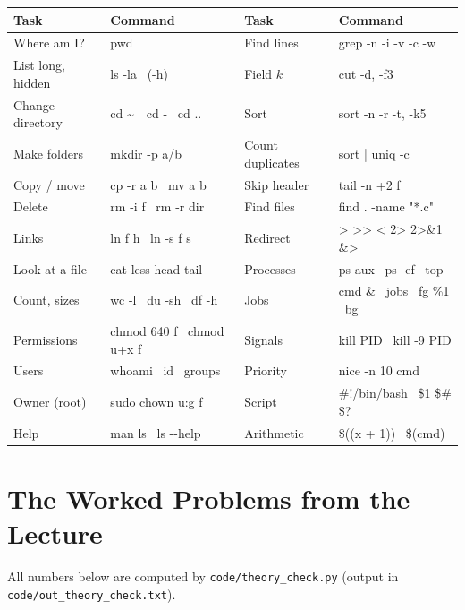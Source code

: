 \documentclass[11pt,a4paper]{article}
\begin{document}
\begin{center}
\vspace{0.6em}
\renewcommand{\arraystretch}{1.15}
\begin{tabularx}{\linewidth}{@{}>{\raggedright\arraybackslash}p{3.0cm}>{\ttfamily\raggedright\arraybackslash}X>{\raggedright\arraybackslash}p{3.0cm}>{\ttfamily\raggedright\arraybackslash}X@{}}
\toprule
\textbf{Task} & \textbf{\rmfamily Command} & \textbf{Task} & \textbf{\rmfamily Command} \\
\midrule
Where am I? & pwd & Find lines & grep -n -i -v -c -w \\
List long, hidden & ls -la \ (-h) & Field $k$ & cut -d, -f3 \\
Change directory & cd \textasciitilde\ \ cd - \ cd .. & Sort & sort -n -r -t, -k5 \\
Make folders & mkdir -p a/b & Count duplicates & sort | uniq -c \\
Copy / move & cp -r a b \ mv a b & Skip header & tail -n +2 f \\
Delete & rm -i f \ rm -r dir & Find files & find . -name "*.c" \\
Links & ln f h \ ln -s f s & Redirect & > >> < 2> 2>\&1 \&> \\
Look at a file & cat less head tail & Processes & ps aux \ ps -ef \ top \\
Count, sizes & wc -l \ du -sh \ df -h & Jobs & cmd \& \ jobs \ fg \%1 \ bg \\
Permissions & chmod 640 f \ chmod u+x f & Signals & kill PID \ kill -9 PID \\
Users & whoami \ id \ groups & Priority & nice -n 10 cmd \\
Owner (root) & sudo chown u:g f & Script & \#!/bin/bash \ \$1 \$\# \$? \\
Help & man ls \ ls -{}-help & Arithmetic & \$((x + 1)) \ \$(cmd) \\
\bottomrule
\end{tabularx}
\end{center}

\section{The Worked Problems from the Lecture}
\label{sec:lecture}

All numbers below are computed by \texttt{code/theory\_check.py} (output in \texttt{code/out\_theory\_check.txt}).

\end{document}
